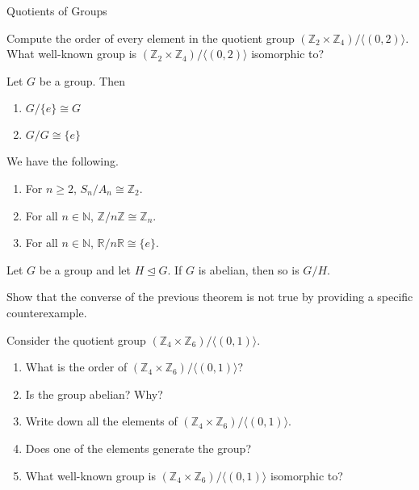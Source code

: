 \begin{section}{Quotients of Groups}
\begin{problem}
Compute the order of every element in the quotient group $(\mathbb{Z}_2\times \mathbb{Z}_4)/\langle (0,2)\rangle$. What well-known group is $(\mathbb{Z}_2\times \mathbb{Z}_4)/\langle (0,2)\rangle$ isomorphic to?
\end{problem}

\begin{theorem}
Let $G$ be a group.  Then
\begin{enumerate}[label=\textrm{(\alph*)}]
\item $G/\{e\}\cong G$
\item $G/G\cong \{e\}$
\end{enumerate}
\end{theorem}

\begin{theorem}
We have the following.
\begin{enumerate}[label=\textrm{(\alph*)}]
\item For $n\geq 2$, $S_n/A_n\cong \mathbb{Z}_2$.
\item For all $n\in\mathbb{N}$, $\mathbb{Z}/n\mathbb{Z}\cong \mathbb{Z}_n$.
\item For all $n\in\mathbb{N}$, $\mathbb{R}/n\mathbb{R}\cong \{e\}$.
\end{enumerate}
\end{theorem}

\begin{theorem}
Let $G$ be a group and let $H\trianglelefteq G$.  If $G$ is abelian, then so is $G/H$.
\end{theorem}

\begin{problem}
Show that the converse of the previous theorem is not true by providing a specific counterexample.
\end{problem}

\begin{problem}
Consider the quotient group $(\mathbb{Z}_4\times \mathbb{Z}_6)/\langle (0,1)\rangle$.
\begin{enumerate}[label=\textrm{(\alph*)}]
\item What is the order of $(\mathbb{Z}_4\times \mathbb{Z}_6)/\langle (0,1)\rangle$?
\item Is the group abelian?  Why?
\item Write down all the elements of $(\mathbb{Z}_4\times \mathbb{Z}_6)/\langle (0,1)\rangle$.
\item Does one of the elements generate the group?
\item What well-known group is $(\mathbb{Z}_4\times \mathbb{Z}_6)/\langle (0,1)\rangle$ isomorphic to?
\end{enumerate}
\end{problem}


\end{section}
